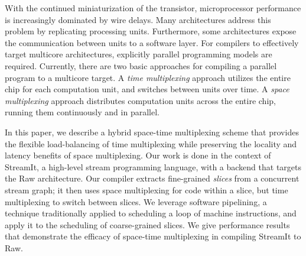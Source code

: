 With the continued miniaturization of the transistor, microprocessor
performance is increasingly dominated by wire delays.  Many
architectures address this problem by replicating processing units.
Furthermore, some architectures expose the communication between units
to a software layer.  For compilers to effectively target multicore
architectures, explicitly parallel programming models are required.
Currently, there are two basic approaches for compiling a parallel
program to a multicore target.  A {\it time multiplexing} approach
utilizes the entire chip for each computation unit, and switches
between units over time.  A {\it space multiplexing} approach distributes
computation units across the entire chip, running them continuously
and in parallel.

In this paper, we describe a hybrid space-time multiplexing scheme
that provides the flexible load-balancing of time multiplexing while
preserving the locality and latency benefits of space multiplexing.
Our work is done in the context of StreamIt, a high-level stream
programming language, with a backend that targets the Raw
architecture.  Our compiler extracts fine-grained {\it slices} from a
concurrent stream graph; it then uses space multiplexing for code
within a slice, but time multiplexing to switch between slices. We
leverage software pipelining, a technique traditionally applied to
scheduling a loop of machine instructions, and apply it to the
scheduling of coarse-grained slices.  We give performance results that
demonstrate the efficacy of space-time multiplexing in compiling
StreamIt to Raw.
